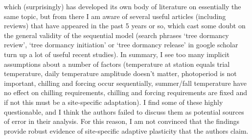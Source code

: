 \documentclass[11pt]{article}
\begin{document}
which (surprisingly) has developed its own body of literature on essentially the same
topic, but from there I am aware of several useful articles (including reviews) that have
appeared in the past 5 years or so, which cast some doubt on the general validity of the
sequential model (search phrases ‘tree dormancy review’, ‘tree dormancy initiation’ or
‘tree dormancy release’ in google scholar turn up a lot of useful recent studies).
In summary, I see too many implicit assumptions about a number of factors (temperature at
station equals trial temperature, daily temperature amplitude doesn’t matter, photoperiod
is not important, chilling and forcing occur sequentially, summer/fall temperature have
no effect on chilling requirements, chilling and forcing requirements are fixed and if
not this must be a site-specific adaptation). I find some of these highly questionable,
and I think the authors failed to discuss them as potential sources of error in their
analysis. For this reason, I am not convinced that the findings provide robust evidence
of site-specific adaptive plasticity that the authors claim.
\end{document}
